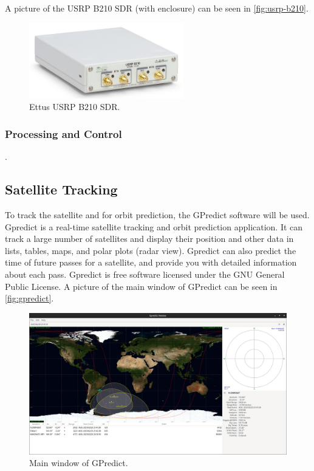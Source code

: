 A picture of the USRP B210 SDR (with enclosure) can be seen in \autoref{fig:usrp-b210}.

\begin{figure}[!ht]
    \begin{center}
        \includegraphics[width=0.6\textwidth]{figures/usrp-b210.jpg}
        \caption{Ettus USRP B210 SDR.}
        \label{fig:usrp-b210}
    \end{center}
\end{figure}

\subsubsection{Processing and Control}

.

\subsection{Satellite Tracking}

To track the satellite and for orbit prediction, the GPredict software \cite{gpredict} will be used. Gpredict is a real-time satellite tracking and orbit prediction application. It can track a large number of satellites and display their position and other data in lists, tables, maps, and polar plots (radar view). Gpredict can also predict the time of future passes for a satellite, and provide you with detailed information about each pass. Gpredict is free software licensed under the GNU General Public License. A picture of the main window of GPredict can be seen in \autoref{fig:gpredict}.

\begin{figure}[!ht]
    \begin{center}
        \includegraphics[width=\textwidth]{figures/gpredict.png}
        \caption{Main window of GPredict.}
        \label{fig:gpredict}
    \end{center}
\end{figure}

